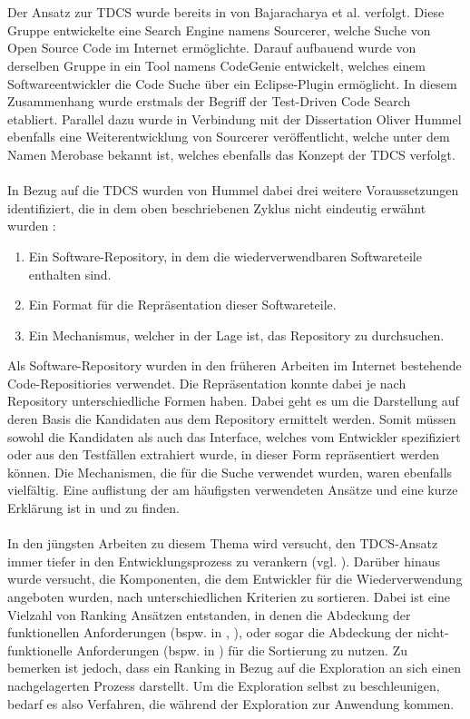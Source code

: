 \\\\
Der Ansatz zur TDCS wurde bereits in \cite{sourcerer} von Bajaracharya et al.  verfolgt. Diese Gruppe entwickelte eine Search Engine namens Sourcerer, welche Suche von Open Source Code im Internet ermöglichte. Darauf aufbauend wurde von derselben Gruppe in \cite{Lemos} ein Tool namens CodeGenie entwickelt, welches einem Softwareentwickler die Code Suche über ein Eclipse-Plugin ermöglicht. In diesem Zusammenhang wurde erstmals der Begriff der Test-Driven Code Search etabliert. Parallel dazu wurde in Verbindung mit der Dissertation Oliver Hummel \cite{hummel08} ebenfalls eine Weiterentwicklung von Sourcerer veröffentlicht, welche unter dem Namen Merobase bekannt ist, welches ebenfalls das Konzept der TDCS verfolgt.
\\\\
In Bezug auf die TDCS wurden von Hummel dabei drei weitere Voraussetzungen identifiziert, die in dem oben beschriebenen Zyklus nicht eindeutig erwähnt wurden \cite{hummel08}:
\begin{enumerate}
\item Ein Software-Repository, in dem die wiederverwendbaren Softwareteile enthalten sind.
\item Ein Format für die Repräsentation dieser Softwareteile.
\item Ein Mechanismus, welcher in der Lage ist, das Repository zu durchsuchen.
\end{enumerate}
\noindent
Als Software-Repository wurden in den früheren Arbeiten im Internet bestehende Code-Repositiories verwendet. Die Repräsentation konnte dabei je nach Repository unterschiedliche Formen haben. Dabei geht es um die Darstellung auf deren Basis die Kandidaten aus dem Repository ermittelt werden. Somit müssen sowohl die Kandidaten als auch das Interface, welches vom Entwickler spezifiziert oder aus den Testfällen extrahiert wurde, in dieser Form repräsentiert werden können. Die Mechanismen, die für die Suche verwendet wurden, waren ebenfalls vielfältig. Eine auflistung der am häufigsten verwendeten Ansätze und eine kurze Erklärung ist in \cite{Hummel2013} und \cite{hummel08} zu finden.
\\\\
In den jüngsten Arbeiten zu diesem Thema wird versucht, den TDCS-Ansatz immer tiefer in den Entwicklungsprozess zu verankern (vgl. \cite{kessel2018}). Darüber hinaus wurde versucht, die Komponenten, die dem Entwickler für die Wiederverwendung angeboten wurden, nach unterschiedlichen Kriterien zu sortieren. Dabei ist eine Vielzahl von Ranking Ansätzen entstanden, in denen die Abdeckung der funktionellen Anforderungen (bspw. in \cite{STOLEE201635}, \cite{kessel2015}), oder sogar die Abdeckung der nicht-funktionelle Anforderungen (bspw. in \cite{kessel2016}) für die Sortierung zu nutzen. Zu bemerken ist jedoch, dass ein Ranking in Bezug auf die Exploration an sich einen nachgelagerten Prozess darstellt. Um die Exploration selbst zu beschleunigen, bedarf es also Verfahren, die während der Exploration zur Anwendung kommen.

